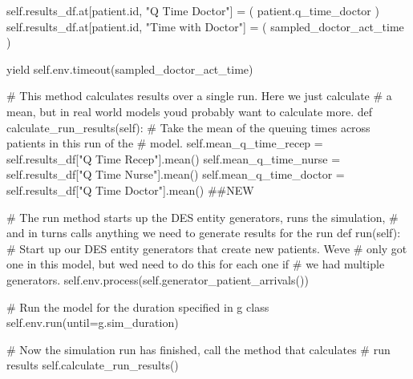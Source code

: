\documentclass[
  letterpaper,
  DIV=11,
  numbers=noendperiod]{scrreprt}
\newenvironment{Shaded}{\begin{snugshade}}{\end{snugshade}}
\newcommand{\BuiltInTok}[1]{\textcolor[rgb]{0.00,0.23,0.31}{#1}}
\newcommand{\CommentTok}[1]{\textcolor[rgb]{0.37,0.37,0.37}{#1}}
\newcommand{\ControlFlowTok}[1]{\textcolor[rgb]{0.00,0.23,0.31}{#1}}
\newcommand{\KeywordTok}[1]{\textcolor[rgb]{0.00,0.23,0.31}{#1}}
\newcommand{\NormalTok}[1]{\textcolor[rgb]{0.00,0.23,0.31}{#1}}
\newcommand{\OperatorTok}[1]{\textcolor[rgb]{0.37,0.37,0.37}{#1}}
\newcommand{\StringTok}[1]{\textcolor[rgb]{0.13,0.47,0.30}{#1}}
\newcommand{\VariableTok}[1]{\textcolor[rgb]{0.07,0.07,0.07}{#1}}
\begin{document}
\begin{tcolorbox}
\begin{Shaded}
\begin{Highlighting}[]
                \VariableTok{self}\NormalTok{.results\_df.at[patient.}\BuiltInTok{id}\NormalTok{, }\StringTok{"Q Time Doctor"}\NormalTok{] }\OperatorTok{=}\NormalTok{ (}
\NormalTok{                    patient.q\_time\_doctor}
\NormalTok{                )}
                \VariableTok{self}\NormalTok{.results\_df.at[patient.}\BuiltInTok{id}\NormalTok{, }\StringTok{"Time with Doctor"}\NormalTok{] }\OperatorTok{=}\NormalTok{ (}
\NormalTok{                    sampled\_doctor\_act\_time}
\NormalTok{                )}

                \ControlFlowTok{yield} \VariableTok{self}\NormalTok{.env.timeout(sampled\_doctor\_act\_time)}

    \CommentTok{\# This method calculates results over a single run.  Here we just calculate}
    \CommentTok{\# a mean, but in real world models you\textquotesingle{}d probably want to calculate more.}
    \KeywordTok{def}\NormalTok{ calculate\_run\_results(}\VariableTok{self}\NormalTok{):}
        \CommentTok{\# Take the mean of the queuing times across patients in this run of the}
        \CommentTok{\# model.}
        \VariableTok{self}\NormalTok{.mean\_q\_time\_recep }\OperatorTok{=} \VariableTok{self}\NormalTok{.results\_df[}\StringTok{"Q Time Recep"}\NormalTok{].mean()}
        \VariableTok{self}\NormalTok{.mean\_q\_time\_nurse }\OperatorTok{=} \VariableTok{self}\NormalTok{.results\_df[}\StringTok{"Q Time Nurse"}\NormalTok{].mean()}
        \VariableTok{self}\NormalTok{.mean\_q\_time\_doctor }\OperatorTok{=} \VariableTok{self}\NormalTok{.results\_df[}\StringTok{"Q Time Doctor"}\NormalTok{].mean() }\CommentTok{\#\#NEW}

    \CommentTok{\# The run method starts up the DES entity generators, runs the simulation,}
    \CommentTok{\# and in turns calls anything we need to generate results for the run}
    \KeywordTok{def}\NormalTok{ run(}\VariableTok{self}\NormalTok{):}
        \CommentTok{\# Start up our DES entity generators that create new patients.  We\textquotesingle{}ve}
        \CommentTok{\# only got one in this model, but we\textquotesingle{}d need to do this for each one if}
        \CommentTok{\# we had multiple generators.}
        \VariableTok{self}\NormalTok{.env.process(}\VariableTok{self}\NormalTok{.generator\_patient\_arrivals())}

        \CommentTok{\# Run the model for the duration specified in g class}
        \VariableTok{self}\NormalTok{.env.run(until}\OperatorTok{=}\NormalTok{g.sim\_duration)}

        \CommentTok{\# Now the simulation run has finished, call the method that calculates}
        \CommentTok{\# run results}
        \VariableTok{self}\NormalTok{.calculate\_run\_results()}


\end{Highlighting}
\end{Shaded}
\end{tcolorbox}
\end{document}

